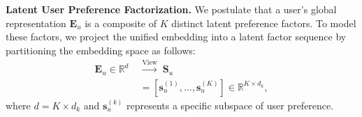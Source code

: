 \documentclass[lettersize,journal]{IEEEtran}
\begin{document}

\noindent \textbf{Latent User Preference Factorization.}
We postulate that a user's global representation $\mathbf{E}_u$ is a composite of $K$ distinct latent preference factors. To model these factors, we project the unified embedding into a latent factor sequence by partitioning the embedding space as follows:
\begin{equation}
\label{eq:mamba_disentangle}
\begin{split}
    \mathbf{E}_u \in \mathbb{R}^{d} \;&\xrightarrow{\text{View}}\; \mathbf{S}_u \\
    &= [\mathbf{s}_u^{(1)}, \dots, \mathbf{s}_u^{(K)}] \in \mathbb{R}^{K \times d_k},
\end{split}
\end{equation}
where $d = K \times d_k$ and $\mathbf{s}_u^{(k)}$ represents a specific subspace of user preference. 
\end{document}
